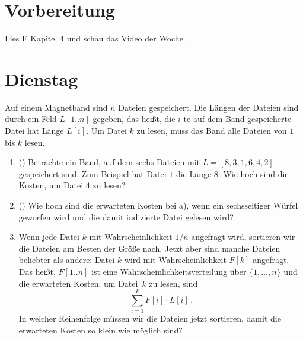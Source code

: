 \documentclass{uebung_cs}
\begin{document}
\section*{Vorbereitung}
Lies E Kapitel 4 und schau das Video der Woche.

\section*{Dienstag}
\begin{aufgabe}
    Auf einem Magnetband sind $n$ Dateien gespeichert.
    Die Längen der Dateien sind durch ein Feld $L[1..n]$ gegeben, das heißt, die $i$-te auf dem Band gespeicherte Datei hat Länge $L[i]$.
    Um Datei $k$ zu lesen, muss das Band alle Dateien von $1$ bis $k$ lesen.
    \begin{enumerate}
        \item(\warmup) Betrachte ein Band, auf dem sechs Dateien mit $L=[8,3,1,6,4,2]$ gespeichert sind. Zum Beispiel hat Datei $1$ die Länge $8$.
        Wie hoch sind die Kosten, um Datei $4$ zu lesen?
        \item(\warmup) Wie hoch sind die erwarteten Kosten bei a), wenn ein sechsseitiger Würfel geworfen wird und die damit indizierte Datei gelesen wird?
        \item Wenn jede Datei $k$ mit Wahrscheinlichkeit $1/n$ angefragt wird, sortieren wir die Dateien am Besten der Größe nach. Jetzt aber sind manche Dateien beliebter als andere: Datei $k$ wird mit Wahrscheinlichkeit $F[k]$ angefragt. Das heißt, $F[1..n]$ ist eine Wahrscheinlichkeitsverteilung über $\{1,\dots,n\}$ und die erwarteten Kosten, um Datei~$k$ zu lesen, sind
        \[\sum_{i=1}^k F[i]\cdot L[i]\,.\]
        In welcher Reihenfolge müssen wir die Dateien jetzt sortieren, damit die erwarteten Kosten so klein wie möglich sind?
    \end{enumerate}
\end{aufgabe}
\end{document}
